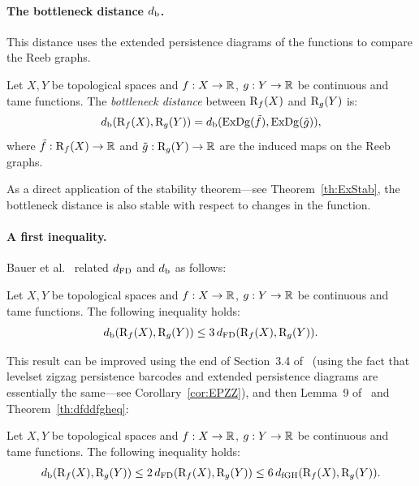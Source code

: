 \paragraph*{The bottleneck distance $d_{\rm b}$.} This distance uses the extended persistence diagrams of the functions to compare the Reeb graphs.

\begin{defin}\label{def:BottleDistReeb}
Let $X,Y$ be topological spaces and $f:X\rightarrow\mathbb{R}$, $g:Y\rightarrow\mathbb{R}$ be continuous and tame functions.
The {\em bottleneck distance} between $\mathrm{R}_f(X)$ and $\mathrm{R}_g(Y)$ is:
\begin{equation}\label{eq:db}
d_{\rm b}(\mathrm{R}_f(X),\mathrm{R}_g(Y))=d_{\rm b}(\mathrm{ExDg}(\tilde f), \mathrm{ExDg}(\tilde g)),
\end{equation}
where $\tilde f:\mathrm{R}_f(X)\rightarrow \mathbb{R}$ and $\tilde g:\mathrm{R}_g(Y)\rightarrow \mathbb{R}$ are the induced maps on the Reeb graphs.
\end{defin}

As a direct application of the stability theorem---see Theorem~\ref{th:ExStab}, 
the bottleneck distance is also stable with respect to changes in the function.



\paragraph*{A first inequality.} Bauer et al.~\cite{Bauer14} related $d_{\rm FD}$ and $d_{\rm b}$ as follows:
%
\begin{thm}\label{th:weakupperbound}
Let $X,Y$ be topological spaces and $f:X\rightarrow\mathbb{R}$, $g:Y\rightarrow\mathbb{R}$ be continuous and tame functions.
The following inequality holds: 
$$d_{\rm b}(\mathrm{R}_f(X),\mathrm{R}_g(Y))\leq 3\,d_{\rm FD}(\mathrm{R}_f(X),\mathrm{R}_g(Y)).$$
\end{thm}
%
This result can be improved using the end of Section~3.4 of~\cite{Bjerkevik16}
(using the fact that levelset zigzag persistence barcodes and extended persistence diagrams are essentially the same---see Corollary~\ref{cor:EPZZ}), 
and then Lemma~9 of~\cite{Bauer15} and Theorem~\ref{th:dfddfgheq}:
%
\begin{thm}\label{th:upperbound}
Let $X,Y$ be topological spaces and $f:X\rightarrow\mathbb{R}$, $g:Y\rightarrow\mathbb{R}$ be continuous and tame functions.
The following inequality holds: 
$$d_{\rm b}(\mathrm{R}_f(X),\mathrm{R}_g(Y))\leq 2\,d_{\rm FD}(\mathrm{R}_f(X),\mathrm{R}_g(Y))\leq 6\,d_{\rm fGH}(\mathrm{R}_f(X),\mathrm{R}_g(Y)).$$
\end{thm}
%



